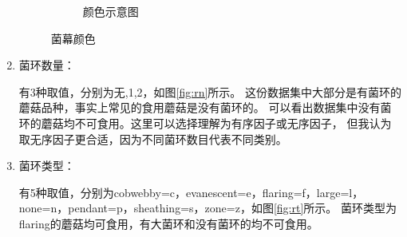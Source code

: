 \documentclass[lang=cn,11pt,a4paper,cite=super]{elegantpaper}
\begin{document}
\begin{enumerate}
\begin{figure}[hbt]
\begin{subfigure}[b]{0.3\textwidth}
        \caption{颜色示意图}
        \label{fig:color}
      \end{subfigure}
      \caption{菌幕颜色}
      \label{fig:veilcol}
   \end{figure}

   \item 菌环数量：\par 有3种取值，分别为无,1,2，如图\ref{fig:rn}所示。
   这份数据集中大部分是有菌环的蘑菇品种，事实上常见的食用蘑菇是没有菌环的。
   可以看出数据集中没有菌环的蘑菇均不可食用。这里可以选择理解为有序因子或无序因子，
   但我认为取无序因子更合适，因为不同菌环数目代表不同类别。

   \item 菌环类型：\par 有5种取值，分别为cobwebby=c，evanescent=e，flaring=f，large=l，
   none=n，pendant=p，sheathing=s，zone=z，如图\ref{fig:rt}所示。
   菌环类型为flaring的蘑菇均可食用，有大菌环和没有菌环的均不可食用。


\end{enumerate}
\end{document}
